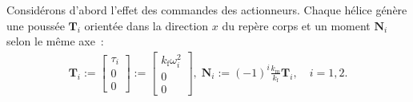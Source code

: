 Considérons d'abord l'effet des commandes des actionneurs. Chaque hélice génère une poussée $\boldsymbol{T}_i$ orientée dans la direction $x$ du repère corps et un moment $\boldsymbol{N}_i$ selon le même axe :
\begin{align}
\label{eq:thrust}
\boldsymbol{T}_{i} \!:=\! \begin{bmatrix} \tau_{i} \\ 0 \\ 0 \end{bmatrix} \!:=\!
\begin{bmatrix} k_{\text{f}}\omega_{i}^{2} \\ 0 \\ 0 \end{bmatrix}\! , \;
\boldsymbol{N}_{i} \!:=\! (-1)^{i}  \frac{k_{\text{m}} }{k_{\text{f}}}\boldsymbol{T}_{i}, \quad i=1,2 .
\end{align} 

